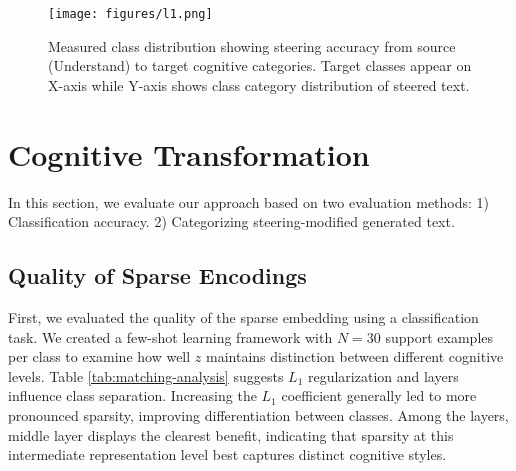 \begin{figure*}[ht]
\centering
  \texttt{[image: figures/l1.png]}
  \caption{ Measured class distribution showing steering accuracy from source (Understand) to target cognitive categories. Target classes appear on X-axis while Y-axis shows class category distribution of steered text. }
  \label{fig:l1}
\end{figure*}








\section{Cognitive Transformation}

In this section, we evaluate our approach based on two evaluation methods: 1) Classification accuracy. 2) Categorizing steering-modified generated text. 


\subsection{Quality of Sparse Encodings}
First, we evaluated the quality of the sparse embedding using a classification task. We created 
a few-shot learning framework with $N=30$ support examples per class to examine how well $z$ maintains distinction between different cognitive levels. Table \ref{tab:matching-analysis} suggests $L_{1}$ regularization and layers influence class separation. Increasing the $L_{1}$ coefficient generally led to more pronounced sparsity, improving differentiation between classes. Among the layers, middle layer displays the clearest benefit, indicating that sparsity at this intermediate representation level best captures distinct cognitive styles.






